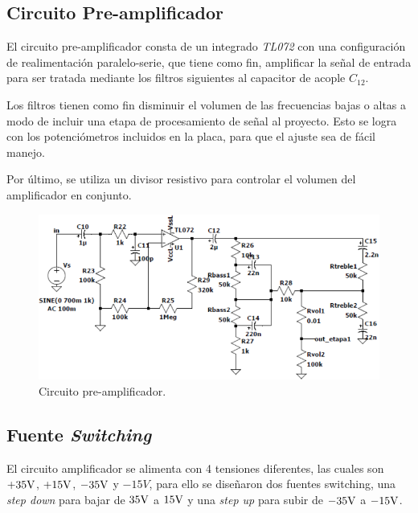 \subsection{Circuito Pre-amplificador}

\par El circuito pre-amplificador consta de un integrado \textit{TL072} con una configuración de realimentación paralelo-serie, que tiene como fin, amplificar la señal de entrada para ser tratada mediante los filtros siguientes al capacitor de acople $C_{12}$.\\

\par Los filtros tienen como fin disminuir el volumen de las frecuencias bajas o altas a modo de incluir una etapa de procesamiento de señal al proyecto. Esto se logra con los potenciómetros incluidos en la placa, para que el ajuste sea de fácil manejo.\\

\par Por último, se utiliza un divisor resistivo para controlar el volumen del amplificador en conjunto.\\

\begin{figure}[H]
    \centering
    \includegraphics[width=0.75 \textwidth]{img/circuito/pre_amplificador.PNG}
    \caption{Circuito pre-amplificador.}
    \label{fig:ciruito_pre}
\end{figure}

\subsection{Fuente \textit{Switching}}

\par El circuito amplificador se alimenta con 4 tensiones diferentes, las cuales son $+35 \si[per-mode=symbol]{\volt}$, $+15 \si[per-mode=symbol]{\volt}$, $-35 \si[per-mode=symbol]{\volt}$ y $-15V$, para ello se diseñaron dos fuentes switching, una \textit{step down} para bajar de $35 \si[per-mode=symbol]{\volt}$ a $15 \si[per-mode=symbol]{\volt}$ y una \textit{step up} para subir de $-35 \si[per-mode=symbol]{\volt}$ a $-15 \si[per-mode=symbol]{\volt}$.\\

